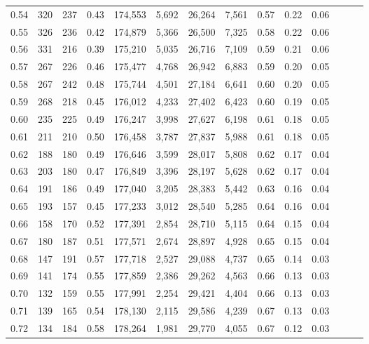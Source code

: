 \begin{tabular}{rrrrrrrrrrrrrr}
0.54 &     320 &  237 &  0.43 &  174,553 &    5,692 &  26,264 &   7,561 &  0.57 &  0.22 &      0.06 \\
0.55 &     326 &  236 &  0.42 &  174,879 &    5,366 &  26,500 &   7,325 &  0.58 &  0.22 &      0.06 \\
0.56 &     331 &  216 &  0.39 &  175,210 &    5,035 &  26,716 &   7,109 &  0.59 &  0.21 &      0.06 \\
0.57 &     267 &  226 &  0.46 &  175,477 &    4,768 &  26,942 &   6,883 &  0.59 &  0.20 &      0.05 \\
0.58 &     267 &  242 &  0.48 &  175,744 &    4,501 &  27,184 &   6,641 &  0.60 &  0.20 &      0.05 \\
0.59 &     268 &  218 &  0.45 &  176,012 &    4,233 &  27,402 &   6,423 &  0.60 &  0.19 &      0.05 \\
0.60 &     235 &  225 &  0.49 &  176,247 &    3,998 &  27,627 &   6,198 &  0.61 &  0.18 &      0.05 \\
0.61 &     211 &  210 &  0.50 &  176,458 &    3,787 &  27,837 &   5,988 &  0.61 &  0.18 &      0.05 \\
0.62 &     188 &  180 &  0.49 &  176,646 &    3,599 &  28,017 &   5,808 &  0.62 &  0.17 &      0.04 \\
0.63 &     203 &  180 &  0.47 &  176,849 &    3,396 &  28,197 &   5,628 &  0.62 &  0.17 &      0.04 \\
0.64 &     191 &  186 &  0.49 &  177,040 &    3,205 &  28,383 &   5,442 &  0.63 &  0.16 &      0.04 \\
0.65 &     193 &  157 &  0.45 &  177,233 &    3,012 &  28,540 &   5,285 &  0.64 &  0.16 &      0.04 \\
0.66 &     158 &  170 &  0.52 &  177,391 &    2,854 &  28,710 &   5,115 &  0.64 &  0.15 &      0.04 \\
0.67 &     180 &  187 &  0.51 &  177,571 &    2,674 &  28,897 &   4,928 &  0.65 &  0.15 &      0.04 \\
0.68 &     147 &  191 &  0.57 &  177,718 &    2,527 &  29,088 &   4,737 &  0.65 &  0.14 &      0.03 \\
0.69 &     141 &  174 &  0.55 &  177,859 &    2,386 &  29,262 &   4,563 &  0.66 &  0.13 &      0.03 \\
0.70 &     132 &  159 &  0.55 &  177,991 &    2,254 &  29,421 &   4,404 &  0.66 &  0.13 &      0.03 \\
0.71 &     139 &  165 &  0.54 &  178,130 &    2,115 &  29,586 &   4,239 &  0.67 &  0.13 &      0.03 \\
0.72 &     134 &  184 &  0.58 &  178,264 &    1,981 &  29,770 &   4,055 &  0.67 &  0.12 &      0.03 \\

\end{tabular}
